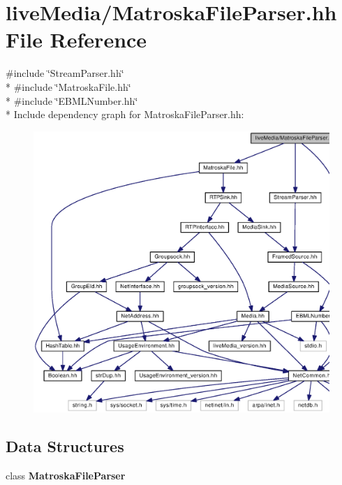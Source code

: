 \section{live\+Media/\+Matroska\+File\+Parser.hh File Reference}
\label{MatroskaFileParser_8hh}
{\ttfamily \#include \char`\"{}Stream\+Parser.\+hh\char`\"{}}\\*
{\ttfamily \#include \char`\"{}Matroska\+File.\+hh\char`\"{}}\\*
{\ttfamily \#include \char`\"{}E\+B\+M\+L\+Number.\+hh\char`\"{}}\\*
Include dependency graph for Matroska\+File\+Parser.\+hh\+:
\nopagebreak
\begin{figure}[H]
\begin{center}
\leavevmode
\includegraphics[width=350pt]{MatroskaFileParser_8hh__incl}
\end{center}
\end{figure}
\subsection*{Data Structures}
\begin{DoxyCompactItemize}
\item 
class {\bf Matroska\+File\+Parser}
\end{DoxyCompactItemize}
